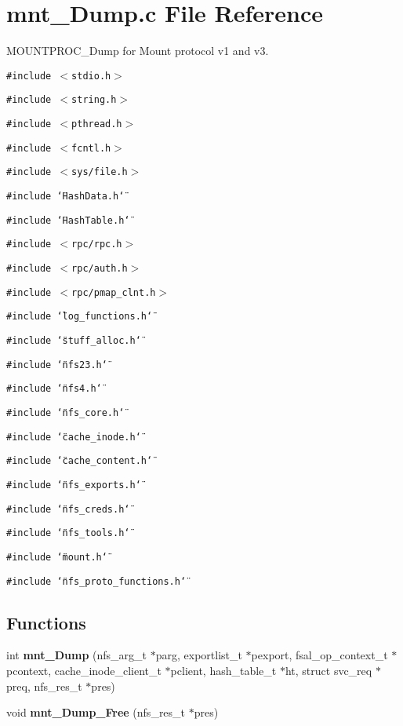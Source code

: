 \section{mnt\_\-Dump.c File Reference}
\label{mnt__Dump_8c}
MOUNTPROC\_\-Dump for Mount protocol v1 and v3.  


{\tt \#include $<$stdio.h$>$}\par
{\tt \#include $<$string.h$>$}\par
{\tt \#include $<$pthread.h$>$}\par
{\tt \#include $<$fcntl.h$>$}\par
{\tt \#include $<$sys/file.h$>$}\par
{\tt \#include \char`\"{}HashData.h\char`\"{}}\par
{\tt \#include \char`\"{}HashTable.h\char`\"{}}\par
{\tt \#include $<$rpc/rpc.h$>$}\par
{\tt \#include $<$rpc/auth.h$>$}\par
{\tt \#include $<$rpc/pmap\_\-clnt.h$>$}\par
{\tt \#include \char`\"{}log\_\-functions.h\char`\"{}}\par
{\tt \#include \char`\"{}stuff\_\-alloc.h\char`\"{}}\par
{\tt \#include \char`\"{}nfs23.h\char`\"{}}\par
{\tt \#include \char`\"{}nfs4.h\char`\"{}}\par
{\tt \#include \char`\"{}nfs\_\-core.h\char`\"{}}\par
{\tt \#include \char`\"{}cache\_\-inode.h\char`\"{}}\par
{\tt \#include \char`\"{}cache\_\-content.h\char`\"{}}\par
{\tt \#include \char`\"{}nfs\_\-exports.h\char`\"{}}\par
{\tt \#include \char`\"{}nfs\_\-creds.h\char`\"{}}\par
{\tt \#include \char`\"{}nfs\_\-tools.h\char`\"{}}\par
{\tt \#include \char`\"{}mount.h\char`\"{}}\par
{\tt \#include \char`\"{}nfs\_\-proto\_\-functions.h\char`\"{}}\par
\subsection*{Functions}
\begin{CompactItemize}
\item 
int {\bf mnt\_\-Dump} (nfs\_\-arg\_\-t $\ast$parg, exportlist\_\-t $\ast$pexport, fsal\_\-op\_\-context\_\-t $\ast$pcontext, cache\_\-inode\_\-client\_\-t $\ast$pclient, hash\_\-table\_\-t $\ast$ht, struct svc\_\-req $\ast$preq, nfs\_\-res\_\-t $\ast$pres)
\item 
void {\bf mnt\_\-Dump\_\-Free} (nfs\_\-res\_\-t $\ast$pres)
\end{CompactItemize}


